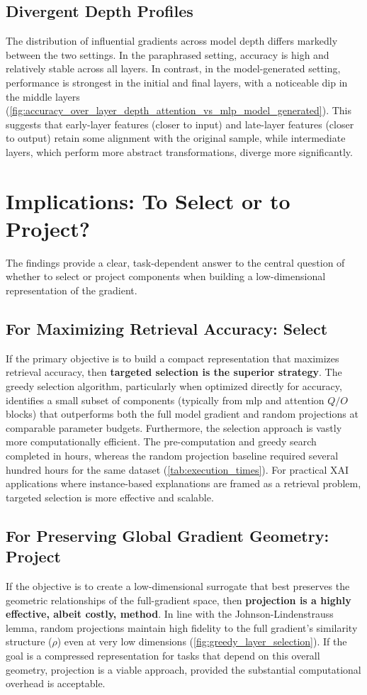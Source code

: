 \subsection{Divergent Depth Profiles}
The distribution of influential gradients across model depth differs markedly between the two settings. In the paraphrased setting, accuracy is high and relatively stable across all layers. In contrast, in the model-generated setting, performance is strongest in the initial and final layers, with a noticeable dip in the middle layers (\autoref{fig:accuracy_over_layer_depth_attention_vs_mlp_model_generated}). This suggests that early-layer features (closer to input) and late-layer features (closer to output) retain some alignment with the original sample, while intermediate layers, which perform more abstract transformations, diverge more significantly.

\section{Implications: To Select or to Project?}
The findings provide a clear, task-dependent answer to the central question of whether to select or project components when building a low-dimensional representation of the gradient.

\subsection{For Maximizing Retrieval Accuracy: Select}
If the primary objective is to build a compact representation that maximizes retrieval accuracy, then \textbf{targeted selection is the superior strategy}. The greedy selection algorithm, particularly when optimized directly for accuracy, identifies a small subset of components (typically from \acrshort{mlp} and attention $Q/O$ blocks) that outperforms both the full model gradient and random projections at comparable parameter budgets. Furthermore, the selection approach is vastly more computationally efficient. The pre-computation and greedy search completed in hours, whereas the random projection baseline required several hundred hours for the same dataset (\autoref{tab:execution_times}). For practical XAI applications where instance-based explanations are framed as a retrieval problem, targeted selection is more effective and scalable.

\subsection{For Preserving Global Gradient Geometry: Project}
If the objective is to create a low-dimensional surrogate that best preserves the geometric relationships of the full-gradient space, then \textbf{projection is a highly effective, albeit costly, method}. In line with the Johnson-Lindenstrauss lemma, random projections maintain high fidelity to the full gradient's similarity structure ($\rho$) even at very low dimensions (\autoref{fig:greedy_layer_selection}). If the goal is a compressed representation for tasks that depend on this overall geometry, projection is a viable approach, provided the substantial computational overhead is acceptable.

